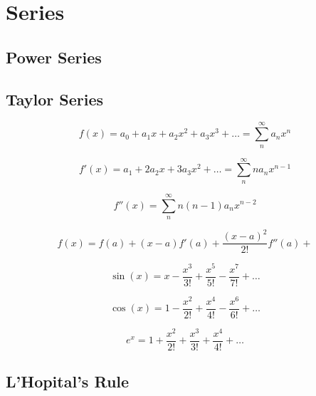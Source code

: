 \chapter{Series}

\section{Power Series}

\section{Taylor Series}

\begin{equation*}
    f(x) = a_0 + a_1 x + a_2 x^2 + a_3 x^3 + \dots = \sum_{n}^{\infty}a_n x^n
\end{equation*}

\begin{equation*}
    f'(x) = a_1 + 2a_2 x + 3a_3 x^2 + \dots = \sum_{n}^{\infty}n a_n x^{n-1}
\end{equation*}

\begin{equation*}
    f''(x) = \sum_{n}^{\infty} n(n-1) a_n x^{n-2}
\end{equation*}

\begin{equation*}
    f(x) = f(a) + (x-a)f'(a) + \frac{(x-a)^2}{2!}f''(a) + 
\end{equation*}

\begin{equation*}
    \sin(x) = x - \frac{x^{3}}{3!} + \frac{x^{5}}{5!} - \frac{x^{7}}{7!} + \dots
\end{equation*}

\begin{equation*}
    \cos(x) = 1 - \frac{x^{2}}{2!} + \frac{x^{4}}{4!} - \frac{x^{6}}{6!} + \dots
\end{equation*}

\begin{equation*}
    e^{x} = 1 + \frac{x^{2}}{2!} + \frac{x^{3}}{3!} + \frac{x^{4}}{4!} + \dots
\end{equation*}

\section{ L’Hopital's Rule}